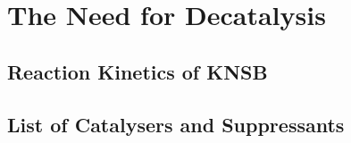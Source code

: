 \section{The Need for Decatalysis}
	\subsection{Reaction Kinetics of KNSB}
		\lipsum[1-3]\cite{Brown_1964}
	\subsection{List of Catalysers and Suppressants}
		\lipsum[1]\cite{Ullmann_1991}
